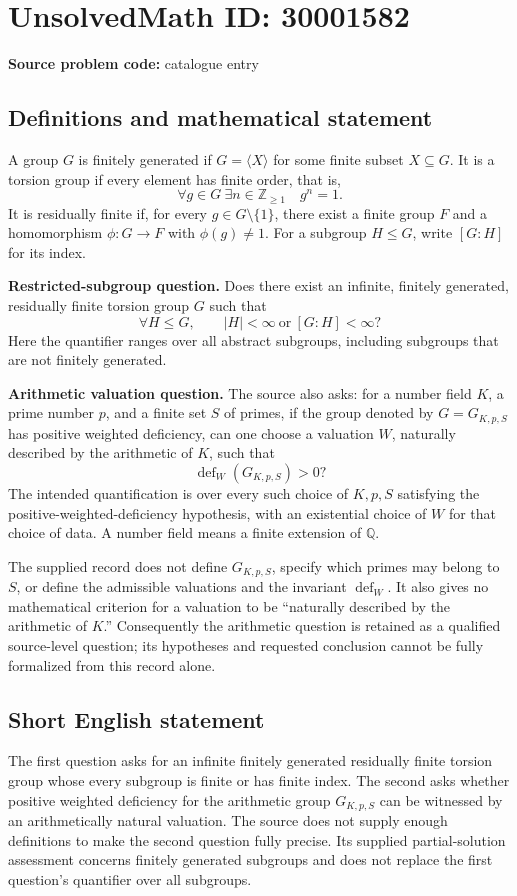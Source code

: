 \documentclass[11pt]{article}
\newcommand{\Z}{\mathbb{Z}}
\newcommand{\Q}{\mathbb{Q}}
\begin{document}
\section*{UnsolvedMath ID: 30001582}
\textbf{Source problem code:} catalogue entry
\subsection{Definitions and mathematical statement}
A group \(G\) is finitely generated if \(G=\langle X\rangle\) for some finite subset \(X\subseteq G\). It is a torsion group if every element has finite order, that is,
\[
\forall g\in G\ \exists n\in\Z_{\geq 1}\quad g^n=1.
\]
It is residually finite if, for every \(g\in G\setminus\{1\}\), there exist a finite group \(F\) and a homomorphism \(\phi:G\to F\) with \(\phi(g)\neq 1\). For a subgroup \(H\leq G\), write \([G:H]\) for its index.

\textbf{Restricted-subgroup question.} Does there exist an infinite, finitely generated, residually finite torsion group \(G\) such that
\[
\forall H\leq G,\qquad |H|<\infty\ \text{or}\ [G:H]<\infty?
\]
Here the quantifier ranges over all abstract subgroups, including subgroups that are not finitely generated.

\textbf{Arithmetic valuation question.} The source also asks: for a number field \(K\), a prime number \(p\), and a finite set \(S\) of primes, if the group denoted by \(G=G_{K,p,S}\) has positive weighted deficiency, can one choose a valuation \(W\), naturally described by the arithmetic of \(K\), such that
\[
\operatorname{def}_{W}(G_{K,p,S})>0?
\]
The intended quantification is over every such choice of \(K,p,S\) satisfying the positive-weighted-deficiency hypothesis, with an existential choice of \(W\) for that choice of data. A number field means a finite extension of \(\Q\).

The supplied record does not define \(G_{K,p,S}\), specify which primes may belong to \(S\), or define the admissible valuations and the invariant \(\operatorname{def}_{W}\). It also gives no mathematical criterion for a valuation to be ``naturally described by the arithmetic of \(K\).'' Consequently the arithmetic question is retained as a qualified source-level question; its hypotheses and requested conclusion cannot be fully formalized from this record alone.
\subsection{Short English statement}
The first question asks for an infinite finitely generated residually finite torsion group whose every subgroup is finite or has finite index. The second asks whether positive weighted deficiency for the arithmetic group \(G_{K,p,S}\) can be witnessed by an arithmetically natural valuation. The source does not supply enough definitions to make the second question fully precise. Its supplied partial-solution assessment concerns finitely generated subgroups and does not replace the first question's quantifier over all subgroups.
\end{document}
